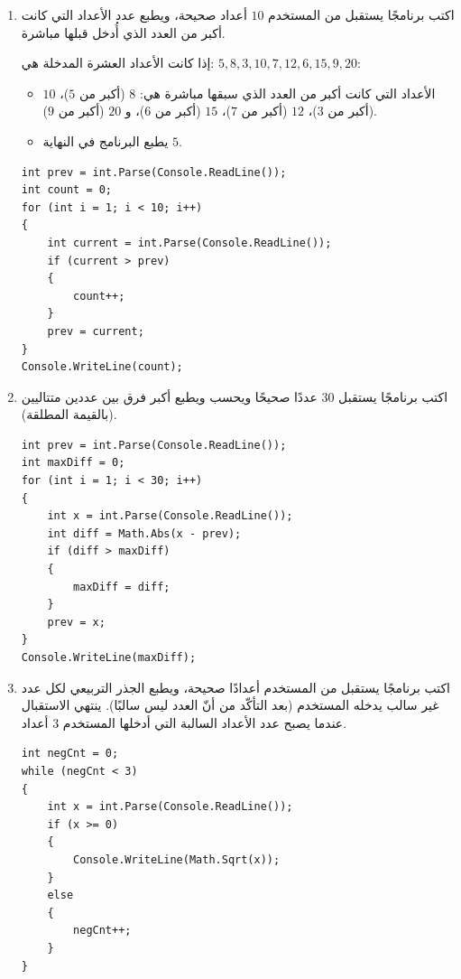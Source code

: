 \documentclass[14pt]{extarticle}
\begin{document}
\begin{enumerate}[resume, itemsep=2em]
\item اكتب برنامجًا يستقبل من المستخدم $10$ أعداد صحيحة، ويطبع عدد الأعداد التي كانت أكبر من العدد الذي أُدخل قبلها مباشرة.
\ifdetailed
\begin{boxExample}
إذا كانت الأعداد العشرة المدخلة هي: $5, 8, 3, 10, 7, 12, 6, 15, 9, 20$:
\begin{itemize}[nosep]
    \item الأعداد التي كانت أكبر من العدد الذي سبقها مباشرة هي: $8$ (أكبر من $5$)، $10$ (أكبر من $3$)، $12$ (أكبر من $7$)، $15$ (أكبر من $6$)، و $20$ (أكبر من $9$).
    \item يطبع البرنامج في النهاية $5$.
\end{itemize}
\end{boxExample}
\fi
\ifwithsols
\begin{boxSolution}
\begin{english}
\begin{verbatim}
int prev = int.Parse(Console.ReadLine());
int count = 0;
for (int i = 1; i < 10; i++)
{
    int current = int.Parse(Console.ReadLine());
    if (current > prev)
    {
        count++;
    }
    prev = current;
}
Console.WriteLine(count);
\end{verbatim}
\end{english}
\end{boxSolution}
\fi
\filbreak

\item اكتب برنامجًا يستقبل $30$ عددًا صحيحًا ويحسب ويطبع أكبر فرق بين عددين متتاليين (بالقيمة المطلقة).
\ifwithsols
\begin{boxSolution}
\begin{english}
\begin{verbatim}
int prev = int.Parse(Console.ReadLine());
int maxDiff = 0;
for (int i = 1; i < 30; i++)
{
    int x = int.Parse(Console.ReadLine());
    int diff = Math.Abs(x - prev);
    if (diff > maxDiff)
    {
        maxDiff = diff;
    }
    prev = x;
}
Console.WriteLine(maxDiff);
\end{verbatim}
\end{english}
\end{boxSolution}
\fi
\filbreak

\item اكتب برنامجًا يستقبل من المستخدم أعدادًا صحيحة، ويطبع الجذر التربيعي لكل عدد غير سالب يدخله المستخدم (بعد التأكّد من أنّ العدد ليس سالبًا). ينتهي الاستقبال عندما يصبح عدد الأعداد السالبة التي أدخلها المستخدم $3$ أعداد.
\ifwithsols
\begin{boxSolution}
\begin{english}
\begin{verbatim}
int negCnt = 0;
while (negCnt < 3)
{
    int x = int.Parse(Console.ReadLine());
    if (x >= 0)
    {
        Console.WriteLine(Math.Sqrt(x));
    }
    else
    {
        negCnt++;
    }
}
\end{verbatim}
\end{english}
\end{boxSolution}
\fi
\filbreak


\end{enumerate}
\end{document}
